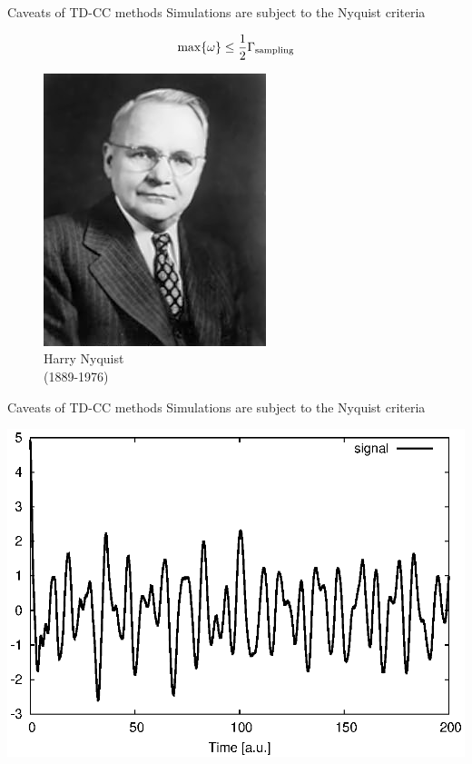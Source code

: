 \documentclass{beamer}
\begin{document}
\begin{frame}{Caveats of TD-CC methods}
Simulations are subject to the Nyquist criteria
\begin{multicols}{2}
\begin{equation}
 \max \{\omega\} \le \frac{1}{2} \Gamma_{\rm sampling} \nonumber
\end{equation}
\begin{figure}
 \includegraphics[scale=0.4]{figures/Harry_Nyquist.jpg}\\
 Harry Nyquist \\ (1889-1976)
\end{figure}
\end{multicols}
\end{frame}

\begin{frame}{Caveats of TD-CC methods}
Simulations are subject to the Nyquist criteria
\begin{center}
  \includegraphics[scale=0.8]{figures/nyquist1.eps}
\end{center}
\end{frame}
\end{document}

